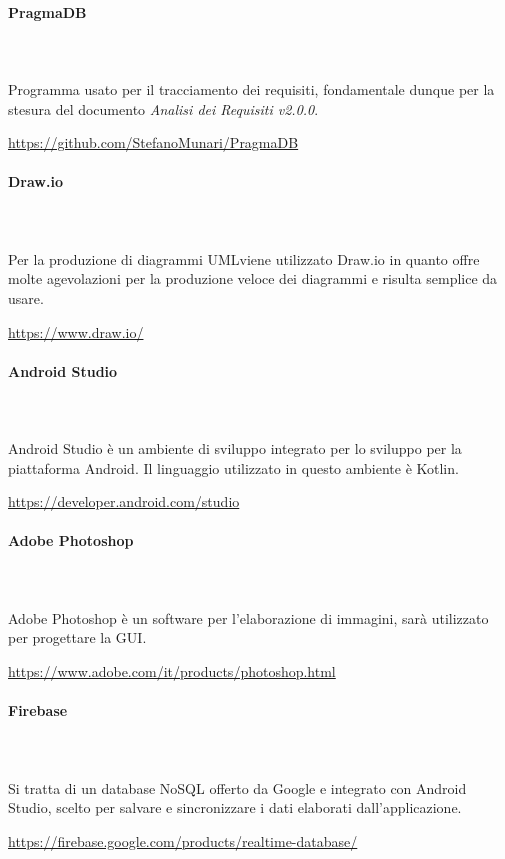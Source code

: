 		\paragraph{PragmaDB} \mbox{}\\ \mbox{}\\
		Programma usato per il tracciamento dei requisiti, fondamentale dunque per la stesura del documento \textit{Analisi dei Requisiti v2.0.0}. \newline
		\centerline{\url{https://github.com/StefanoMunari/PragmaDB}}
		\paragraph{Draw.io} \mbox{}\\ \mbox{}\\
		Per la produzione di diagrammi UML\glosp viene utilizzato Draw.io in quanto offre molte agevolazioni per la produzione veloce dei diagrammi e risulta semplice da usare. \newline
		\centerline{\url{https://www.draw.io/}}
		\paragraph{Android Studio} \mbox{}\\ \mbox{}\\
		Android Studio è un ambiente di sviluppo integrato per lo sviluppo per la piattaforma Android\glo. Il linguaggio utilizzato in questo ambiente è Kotlin\glo.
		 \newline
		\centerline{\url{https://developer.android.com/studio}}
		\paragraph{Adobe Photoshop} \mbox{}\\ \mbox{}\\
		Adobe Photoshop è un software per l'elaborazione di immagini, sarà utilizzato per progettare la GUI\glo.
		\newline
		\centerline{\url{https://www.adobe.com/it/products/photoshop.html}}
		\paragraph{Firebase} \mbox{}\\ \mbox{}\\
		Si tratta di un database NoSQL offerto da Google e integrato con Android Studio, scelto per salvare e sincronizzare i dati elaborati dall'applicazione.
		\newline
		\centerline{\url{https://firebase.google.com/products/realtime-database/}}
